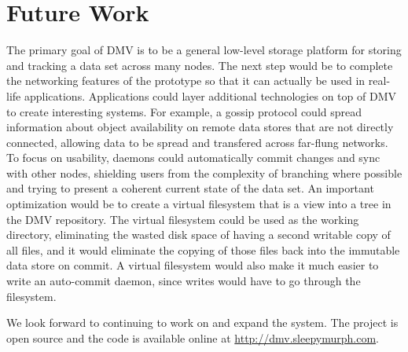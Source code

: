 \section{Future Work}

The primary goal of \gls{DMV} is to be a general low-level storage platform for
storing and tracking a data set across many nodes. The next step would be to
complete the networking features of the prototype so that it can actually be
used in real-life applications. Applications could layer additional technologies
on top of \gls{DMV} to create interesting systems. For example, a gossip
protocol could spread information about object availability on remote data
stores that are not directly connected, allowing data to be spread and
transfered across far-flung networks. To focus on usability, daemons could
automatically \gls{commit} changes and sync with other nodes, shielding users
from the complexity of branching where possible and trying to present a coherent
current state of the data set. An important optimization would be to create a
virtual filesystem that is a view into a \gls{tree} in the \gls{DMV} repository.
The virtual filesystem could be used as the working directory, eliminating the
wasted disk space of having a second writable copy of all files, and it would
eliminate the copying of those files back into the immutable data store on
\gls{commit}. A virtual filesystem would also make it much easier to write an
auto-\gls{commit} daemon, since writes would have to go through the filesystem.

We look forward to continuing to work on and expand the system. The project is
open source and the code is available online at
\url{http://dmv.sleepymurph.com}.
